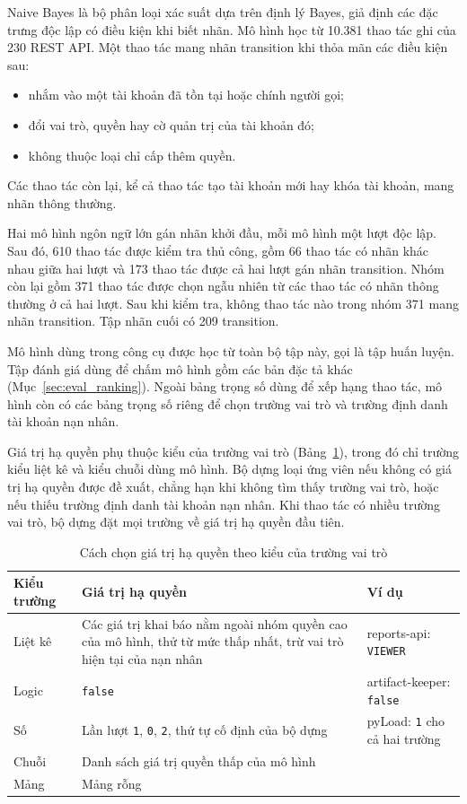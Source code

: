 Naive Bayes là bộ phân loại xác suất dựa trên định lý Bayes, giả định các đặc trưng độc lập có điều kiện khi biết nhãn. Mô hình học từ 10.381 thao tác ghi của 230 REST API. Một thao tác mang nhãn transition khi thỏa mãn các điều kiện sau:
\begin{itemize}
    \item nhắm vào một tài khoản đã tồn tại hoặc chính người gọi;
    \item đổi vai trò, quyền hay cờ quản trị của tài khoản đó;
    \item không thuộc loại chỉ cấp thêm quyền.
\end{itemize}
Các thao tác còn lại, kể cả thao tác tạo tài khoản mới hay khóa tài khoản, mang nhãn thông thường.

Hai mô hình ngôn ngữ lớn gán nhãn khởi đầu, mỗi mô hình một lượt độc lập. Sau đó, 610 thao tác được kiểm tra thủ công, gồm 66 thao tác có nhãn khác nhau giữa hai lượt và 173 thao tác được cả hai lượt gán nhãn transition. Nhóm còn lại gồm 371 thao tác được chọn ngẫu nhiên từ các thao tác có nhãn thông thường ở cả hai lượt. Sau khi kiểm tra, không thao tác nào trong nhóm 371 mang nhãn transition. Tập nhãn cuối có 209 transition.

Mô hình dùng trong công cụ được học từ toàn bộ tập này, gọi là tập huấn luyện. Tập đánh giá dùng để chấm mô hình gồm các bản đặc tả khác (Mục~\ref{sec:eval_ranking}). Ngoài bảng trọng số dùng để xếp hạng thao tác, mô hình còn có các bảng trọng số riêng để chọn trường vai trò và trường định danh tài khoản nạn nhân.

Giá trị hạ quyền phụ thuộc kiểu của trường vai trò (Bảng~\ref{tab:role_values}), trong đó chỉ trường kiểu liệt kê và kiểu chuỗi dùng mô hình. Bộ dựng loại ứng viên nếu không có giá trị hạ quyền được đề xuất, chẳng hạn khi không tìm thấy trường vai trò, hoặc nếu thiếu trường định danh tài khoản nạn nhân. Khi thao tác có nhiều trường vai trò, bộ dựng đặt mọi trường về giá trị hạ quyền đầu tiên.

\begin{table}[htbp]
  \centering
  \caption{Cách chọn giá trị hạ quyền theo kiểu của trường vai trò}
  \label{tab:role_values}
  \begin{tabularx}{\textwidth}{@{}l >{\raggedright\arraybackslash}X l@{}}
    \toprule
    Kiểu trường & Giá trị hạ quyền & Ví dụ \\
    \midrule
    Liệt kê & Các giá trị khai báo nằm ngoài nhóm quyền cao của mô hình, thử từ mức thấp nhất, trừ vai trò hiện tại của nạn nhân & reports-api: \texttt{VIEWER} \\
    Logic & \texttt{false} & artifact-keeper: \texttt{false} \\
    Số & Lần lượt \texttt{1}, \texttt{0}, \texttt{2}, thứ tự cố định của bộ dựng & pyLoad: \texttt{1} cho cả hai trường \\
    Chuỗi & Danh sách giá trị quyền thấp của mô hình & \\
    Mảng & Mảng rỗng & \\
    \bottomrule
  \end{tabularx}
\end{table}

